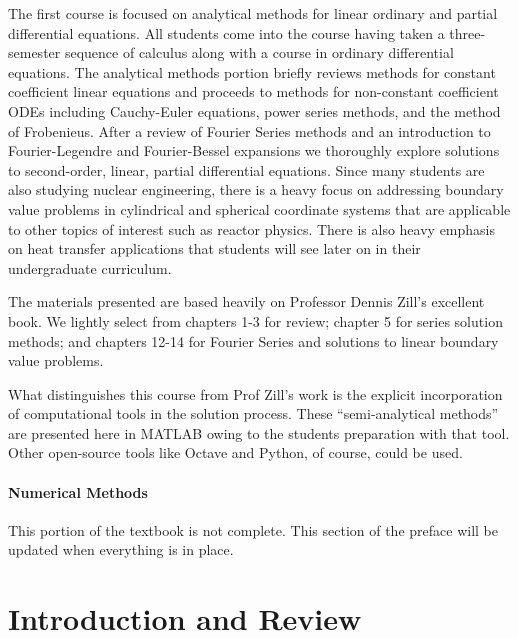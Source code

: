 \documentclass{tufte-book}
\theoremstyle{break}
\begin{document}
The first course is focused on analytical methods for linear ordinary and partial differential equations.  All students come into the course having taken a three-semester sequence of calculus along with a course in ordinary differential equations.  The analytical methods portion briefly reviews methods for constant coefficient linear equations and proceeds to methods for non-constant coefficient ODEs including Cauchy-Euler equations, power series methods, and the method of Frobenieus.  After a review of Fourier Series methods and an introduction to Fourier-Legendre and Fourier-Bessel expansions we thoroughly explore solutions to second-order, linear, partial differential equations.  Since many students are also studying nuclear engineering, there is a heavy focus on addressing boundary value problems in cylindrical and spherical coordinate systems that are applicable to other topics of interest such as reactor physics.  There is also heavy emphasis on heat transfer applications that students will see later on in their undergraduate curriculum.

The materials presented are based heavily on Professor Dennis Zill's excellent book.\cite[-3cm]{zill2020advanced} We lightly select from chapters 1-3 for review; chapter 5 for series solution methods; and chapters 12-14 for Fourier Series and solutions to linear boundary value problems.  

What distinguishes this course from Prof Zill's work is the explicit incorporation of computational tools in the solution process.  These ``semi-analytical methods'' are presented here in MATLAB\cite[-3.75cm]{matlab} owing to the students preparation with that tool.  Other open-source tools like Octave\cite[-3.5cm]{octave} and Python,\cite[-1cm]{10.5555/1593511} of course, could be used. 

\subsection*{Numerical Methods}

This portion of the textbook is not complete.  This section of the preface will be updated when everything is in place.
\mainmatter

\part{Introduction and Review}









\end{document}
